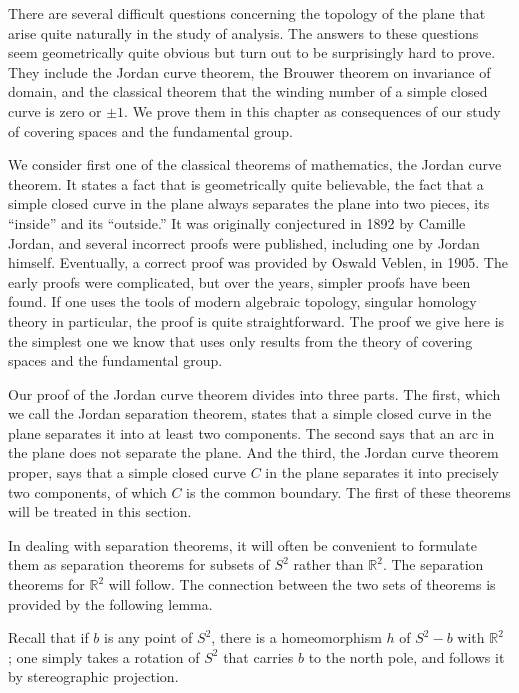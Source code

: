 
There are several difficult questions concerning the topology of the plane that arise quite naturally in the study of analysis. The answers to these questions seem geometrically quite obvious but turn out to be surprisingly hard to prove. They include the Jordan curve theorem, the Brouwer theorem on invariance of domain, and the classical theorem that the winding number of a simple closed curve is zero or \(\pm 1\). We prove them in this chapter as consequences of our study of covering spaces and the fundamental group.


We consider first one of the classical theorems of mathematics, the Jordan curve theorem. It states a fact that is geometrically quite believable, the fact that a simple closed curve in the plane always separates the plane into two pieces, its ``inside'' and its ``outside.'' It was originally conjectured in 1892 by Camille Jordan, and several incorrect proofs were published, including one by Jordan himself. Eventually, a correct proof was provided by Oswald Veblen, in 1905. The early proofs were complicated, but over the years, simpler proofs have been found. If one uses the tools of modern algebraic topology, singular homology theory in particular, the proof is quite straightforward. The proof we give here is the simplest one we know that uses only results from the theory of covering spaces and the fundamental group.

Our proof of the Jordan curve theorem divides into three parts. The first, which we call the Jordan separation theorem, states that a simple closed curve in the plane separates it into at least two components. The second says that an arc in the plane does not separate the plane. And the third, the Jordan curve theorem proper, says that a simple closed curve \(C\) in the plane separates it into precisely two components, of which \(C\) is the common boundary. The first of these theorems will be treated in this section.

In dealing with separation theorems, it will often be convenient to formulate them as separation theorems for subsets of \(S^{2}\) rather than \(\mathbb{R}^{2}\). The separation theorems for \(\mathbb{R}^{2}\) will follow. The connection between the two sets of theorems is provided by the following lemma.

Recall that if \(b\) is any point of \(S^{2}\), there is a homeomorphism \(h\) of \(S^{2} - b\) with \(\mathbb{R}^{2}\) ; one simply takes a rotation of \(S^{2}\) that carries \(b\) to the north pole, and follows it by stereographic projection.

